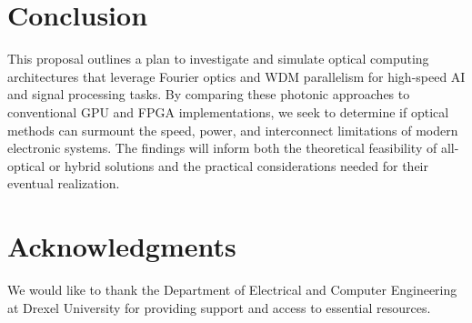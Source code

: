 \documentclass[conference]{IEEEtran}
\begin{document}
\section{Conclusion}
This proposal outlines a plan to investigate and simulate optical computing architectures that leverage Fourier optics and WDM parallelism for high-speed AI and signal processing tasks. By comparing these photonic approaches to conventional GPU and FPGA implementations, we seek to determine if optical methods can surmount the speed, power, and interconnect limitations of modern electronic systems. The findings will inform both the theoretical feasibility of all-optical or hybrid solutions and the practical considerations needed for their eventual realization.

\section*{Acknowledgments}
We would like to thank the Department of Electrical and Computer Engineering at Drexel University for providing support and access to essential resources.
\end{document}

